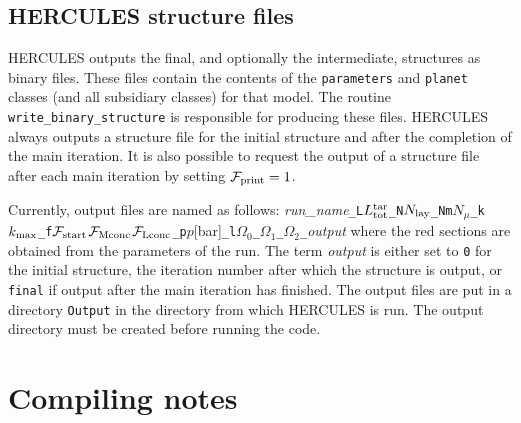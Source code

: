 \documentclass[11pt, oneside]{article}   	%
\begin{document}
\subsection{HERCULES structure files}

HERCULES outputs the final, and optionally the intermediate, structures as binary files.
These files contain the contents of the \texttt{parameters} and \texttt{planet} classes (and all subsidiary classes) for that model. 
The routine \texttt{write\_binary\_structure} is responsible for producing these files.
HERCULES always outputs a structure file for the initial structure and after the completion of the main iteration.
It is also possible to request the output of a structure file after each main iteration by setting $\mathcal{F}_{\rm print}=1$.

Currently, output files are named as follows:
\newline \newline
{\it \textcolor{red!75!black}{run\_name}}\verb|_L|{\it\textcolor{red!75!black}{$L_{\rm tot}^{\rm tar}$}}\verb|_N|\textcolor{red!75!black}{$N_{\rm lay}$}\verb|_Nm|\textcolor{red!75!black}{$N_{\mu}$}\verb|_k|\textcolor{red!75!black}{$k_{\rm max}$}\verb|_f|\textcolor{red!75!black}{$\mathcal{F}_{\rm start}$}\textcolor{red!75!black}{$\mathcal{F}_{\rm Mconc}$}\textcolor{red!75!black}{$\mathcal{F}_{\rm Lconc}$}\verb|_p|\textcolor{red!75!black}{$p$[bar]}\verb|_l|\textcolor{red!75!black}{$\Omega_0$}\verb|_|\textcolor{red!75!black}{$\Omega_1$}\verb|_|\textcolor{red!75!black}{$\Omega_2$}\verb|_|{\it \textcolor{red!75!black}{output}}
\newline \newline \noindent
where the red sections are obtained from the parameters of the run. 
The term {\it output} is either set to \texttt{0} for the initial structure, the iteration number after which the structure is output, or \texttt{final} if output after the main iteration has finished.
The output files are put in a directory \texttt{Output} in the directory from which HERCULES is run. The output directory must be created before running the code.

\section{Compiling notes}
\label{HUG:sec:compiling}
\end{document}
